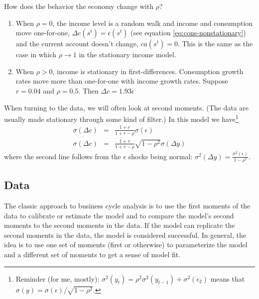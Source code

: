 \documentclass[11pt,pdftex,twoside,letterpaper]{exam}
\begin{document}
How does the behavior the economy change with $\rho$?
\begin{enumerate}
  \item When $\rho = 0$, the income level is a random walk and income and consumption move one-for-one, $\Delta c(s^t)=\epsilon(s^t)$ (see equation \ref{eq:cons-nonstationary}) and the current account doesn't change, $ca(s^t)=0$. This is the same as the case in which $\rho\rightarrow 1$ in the stationary income model.
  \item When $\rho>0$, income is stationary in first-differences. Consumption growth rates move more than one-for-one with income growth rates. Suppose $r=0.04$ and $\rho=0.5$. Then $\Delta c = 1.93 \epsilon$
\end{enumerate}
When turning to the data, we will often look at second moments. (The data are usually made stationary through some kind of filter.) In this model we have\footnote{Reminder (for me, mostly): $\sigma^2(y_t)=\rho^2 \sigma^2(y_{t-1}) + \sigma^2(\epsilon_2)$ means that $\sigma(y) = \sigma(\epsilon)/\sqrt{1-\rho^2}$.}
\begin{eqnarray}
  \sigma(\Delta c) &=& \frac{1+r}{1+r-\rho}\sigma(\epsilon)\\
  \sigma(\Delta c) &=& \frac{1+r}{1+r-\rho}\sqrt{1-\rho^2}\sigma(\Delta y)
\end{eqnarray}
where the second line follows from the $\epsilon$ shocks being normal: $\sigma^2(\Delta y) = \frac{\sigma^2(\epsilon)}{1-\rho^2}$.

\subsection{Data}

The classic approach to business cycle analysis is to use the first moments of the data to calibrate or estimate the model and to compare the model's second moments to the second moments in the data. If the model can replicate the second moments in the data, the model is considered successful. In general, the idea is to use one set of moments (first or otherwise) to parameterize the model and a different set of moments to get a sense of model fit.
\end{document}
